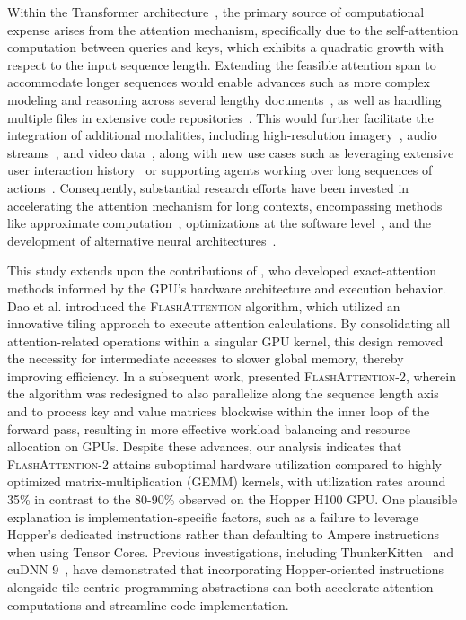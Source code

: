 Within the Transformer architecture~\citep{vaswani2017attention}, the primary source of computational expense arises from the attention mechanism, specifically due to the self-attention computation between queries and keys, which exhibits a quadratic growth with respect to the input sequence length. Extending the feasible attention span to accommodate longer sequences would enable advances such as more complex modeling and reasoning across several lengthy documents~\citep{guo2021longt5,shaham2022scrolls,peng2023yarn}, as well as handling multiple files in extensive code repositories~\citep{roziere2023code, li2023starcoder}. This would further facilitate the integration of additional modalities, including high-resolution imagery~\citep{chen2022scaling}, audio streams~\citep{gulati2020conformer}, and video data~\citep{ho2022video}, along with new use cases such as leveraging extensive user interaction history~\citep{sun2019bert4rec} or supporting agents working over long sequences of actions~\citep{yao2022react}. Consequently, substantial research efforts have been invested in accelerating the attention mechanism for long contexts, encompassing methods like approximate computation~\citep{katharopoulos2020transformers,choromanski2020rethinking, tay2020efficient}, optimizations at the software level~\citep{rabe2021self,dao2022flashattention,kwon2023efficient}, and the development of alternative neural architectures~\citep{peng2023rwkv,sun2023retentive,gu2023mamba}.

This study extends upon the contributions of \citet{dao2022flashattention}, who developed exact-attention methods informed by the GPU’s hardware architecture and execution behavior. Dao et al. \citep{dao2022flashattention} introduced the \textsc{FlashAttention} algorithm, which utilized an innovative tiling approach to execute attention calculations. By consolidating all attention-related operations within a singular GPU kernel, this design removed the necessity for intermediate accesses to slower global memory, thereby improving efficiency. In a subsequent work, \citet{dao2023flashattention2} presented \textsc{FlashAttention-2}, wherein the algorithm was redesigned to also parallelize along the sequence length axis and to process key and value matrices blockwise within the inner loop of the forward pass, resulting in more effective workload balancing and resource allocation on GPUs. Despite these advances, our analysis indicates that \textsc{FlashAttention-2} attains suboptimal hardware utilization compared to highly optimized matrix-multiplication (GEMM) kernels, with utilization rates around 35\% in contrast to the 80-90\% observed on the Hopper H100 GPU. One plausible explanation is implementation-specific factors, such as a failure to leverage Hopper’s dedicated instructions rather than defaulting to Ampere instructions when using Tensor Cores. Previous investigations, including ThunkerKitten~\citep{spector2024thunder} and cuDNN 9~\citep{cudnn9}, have demonstrated that incorporating Hopper-oriented instructions alongside tile-centric programming abstractions can both accelerate attention computations and streamline code implementation.


